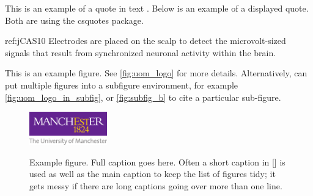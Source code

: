     This is an example of a quote in text . Below is an example of a displayed quote. Both are using the csquotes package.
    \begin{displaycquote}{ref:jCAS10}
      Electrodes are placed on the scalp to detect the microvolt-sized signals that result from synchronized neuronal activity within the brain.
    \end{displaycquote}

    This is an example figure. See \autoref{fig:uom_logo} for more details. Alternatively, can put multiple figures into a subfigure environment, for example \autoref{fig:uom_logo_in_subfig}, or \autoref{fig:subfig_b} to cite a particular sub-figure.
    \begin{figure}
      \centering
      \includegraphics[alt={Put short description for screen readers here},width=0.3\textwidth,keepaspectratio=true]{uom_logo.pdf}
      \caption[Short caption for list of figures]{Example figure. Full caption goes here. Often a short caption in [] is used as well as the main caption to keep the list of figures tidy; it gets messy if there are long captions going over more than one line.}
      \label{fig:uom_logo}
    \end{figure} 

